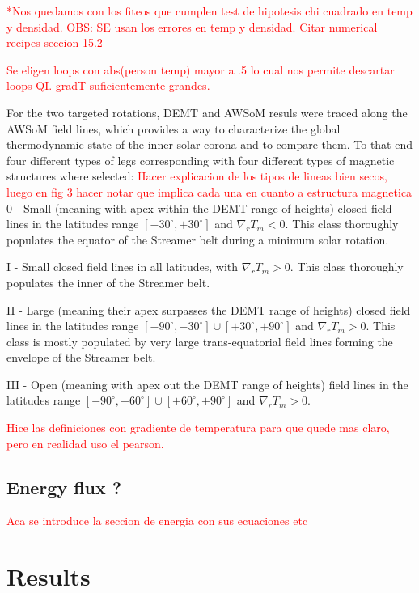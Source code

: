 \documentclass[namedreferences]{solarphysics}
\newcommand{\mdeg}{^\circ}
\begin{document}
\begin{article}
\textcolor{red}{*Nos quedamos con los fiteos que cumplen test de hipotesis chi cuadrado en temp y densidad.
OBS: SE usan los errores en temp y densidad. Citar numerical recipes seccion 15.2 \citet{recipes}}

\textcolor{red}{Se eligen loops con abs(person temp) mayor a .5 lo cual nos permite descartar loops QI. gradT suficientemente grandes.}

For the two targeted rotations, DEMT and AWSoM resuls were traced along the AWSoM field lines, which provides a way to characterize the global thermodynamic state of the inner solar corona and to compare them. To that end four different types of legs corresponding with four different types of magnetic structures where selected:
\textcolor{red}{Hacer explicacion de los tipos de lineas bien secos, luego en fig 3 hacer notar que implica cada una en cuanto a estructura magnetica}
  0 - Small (meaning with apex within the DEMT range of heights) closed field lines in the latitudes range $[-30\mdeg,+30\mdeg]$ and $\nabla_r T_m < 0$. This class thoroughly populates the equator of the Streamer belt during a minimum solar rotation.

  I - Small closed field lines in all latitudes, with $\nabla_r T_m > 0$. This class thoroughly populates the inner of the Streamer belt.

  II - Large (meaning their apex surpasses the DEMT range of heights) closed field lines in the latitudes range $[-90\mdeg,-30\mdeg] \cup [+30\mdeg,+90\mdeg]$ and $\nabla_r T_m > 0$. This class is mostly populated by very large trans-equatorial field lines forming the envelope of the Streamer belt. 

 III - Open (meaning with apex out the DEMT range of heights) field lines in the latitudes range $[-90\mdeg,-60\mdeg] \cup [+60\mdeg,+90\mdeg]$ and $\nabla_r T_m > 0$.

\textcolor{red}{Hice las definiciones con gradiente de temperatura para que quede mas claro, pero en realidad uso el pearson.} 


\subsection{Energy flux ?}\label{energia} 
\textcolor{red}{Aca se introduce la seccion de energia con sus ecuaciones etc}

\section{Results}\label{resu} 


\end{article}
\end{document}
